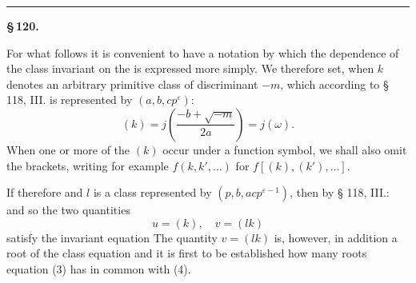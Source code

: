 
\begin{center}

\end{center}

\begin{center}\rule{0.18\linewidth}{0.4pt}\end{center}

\begin{center}
\textbf{\S\,120. }
\end{center}

For what follows it is convenient to have a notation by which the
dependence of the class invariant on the  is expressed
more simply. We therefore set, when $k$ denotes an arbitrary
 primitive class of discriminant $-m$, which
according to § 118, III. is represented by $(a, b, c p^{\varepsilon})$:
\[
(k) = j\left(\frac{-b + \sqrt{-m}}{2a}\right) = j(\omega).
\]
When one or more of the $(k)$ occur under a function
 symbol, we shall also omit the brackets,
writing for example $f(k, k', \ldots)$ for $f[(k), (k'), \ldots]$.

If therefore
and $l$ is a class represented by $(p, b, a c p^{\varepsilon-1})$, then by
§ 118, III.:
and so the two quantities
\[
u = (k), \quad v = (lk)
\]
satisfy the invariant equation
The quantity $v = (lk)$ is, however, in addition a root of the
class equation
and it is first to be established how many roots equation
(3) has in common with (4).
